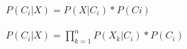 \documentclass{article}
\begin{document}
$P(C_i |X) = P(X | C_i ) * P(Ci)$\\\\
$P(C_i | X ) =  \prod_{k=1}^n P(X_k | C_i) * P(C_i)$
\end{document}
